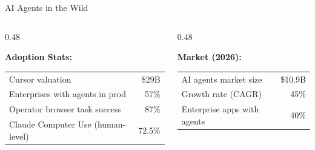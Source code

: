 \documentclass[aspectratio=169,9pt]{beamer}
\begin{document}
\begin{frame}{AI Agents in the Wild}
\vspace{0.5em}
\begin{columns}[T]
\begin{column}{0.48\textwidth}
\begin{graybox}
\textbf{Adoption Stats:}\\[0.2em]
\scriptsize
\begin{tabular}{p{4cm}r}
Cursor valuation & \$29B \\
Enterprises with agents in prod & 57\% \\
Operator browser task success & 87\% \\
Claude Computer Use (human-level) & 72.5\% \\
\end{tabular}
\end{graybox}
\end{column}

\begin{column}{0.48\textwidth}
\begin{graybox}
\textbf{Market (2026):}\\[0.2em]
\scriptsize
\begin{tabular}{p{4cm}r}
AI agents market size & \$10.9B \\
Growth rate (CAGR) & 45\% \\
Enterprise apps with agents & 40\% \\
\end{tabular}
\end{graybox}
\end{column}
\end{columns}
\end{frame}
\end{document}
